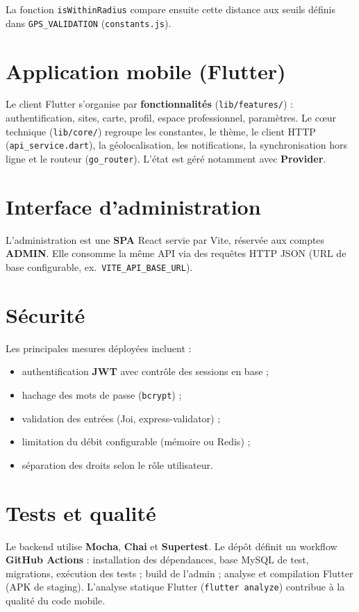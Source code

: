 La fonction \texttt{isWithinRadius} compare ensuite cette distance aux seuils définis dans \texttt{GPS\_VALIDATION} (\texttt{constants.js}).

\section{Application mobile (Flutter)}

Le client Flutter s'organise par \textbf{fonctionnalités} (\texttt{lib/features/}) : authentification, sites, carte, profil, espace professionnel, paramètres. Le cœur technique (\texttt{lib/core/}) regroupe les constantes, le thème, le client HTTP (\texttt{api\_service.dart}), la géolocalisation, les notifications, la synchronisation hors ligne et le routeur (\texttt{go\_router}). L'état est géré notamment avec \textbf{Provider}.

\section{Interface d'administration}

L'administration est une \textbf{SPA} React servie par Vite, réservée aux comptes \textbf{ADMIN}. Elle consomme la même API via des requêtes HTTP JSON (URL de base configurable, ex.\ \texttt{VITE\_API\_BASE\_URL}).

\section{Sécurité}

Les principales mesures déployées incluent :
\begin{itemize}[leftmargin=*]
  \item authentification \textbf{JWT} avec contrôle des sessions en base ;
  \item hachage des mots de passe (\texttt{bcrypt}) ;
  \item validation des entrées (Joi, express-validator) ;
  \item limitation du débit configurable (mémoire ou Redis) ;
  \item séparation des droits selon le rôle utilisateur.
\end{itemize}

\section{Tests et qualité}

Le backend utilise \textbf{Mocha}, \textbf{Chai} et \textbf{Supertest}. Le dépôt définit un workflow \textbf{GitHub Actions} : installation des dépendances, base MySQL de test, migrations, exécution des tests ; build de l'admin ; analyse et compilation Flutter (APK de staging). L'analyse statique Flutter (\texttt{flutter analyze}) contribue à la qualité du code mobile.

